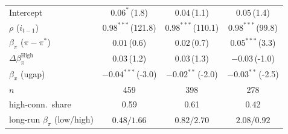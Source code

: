 \begin{tabular}{lccc}
Intercept & $0.06^{*}$\,{\scriptsize(1.8)} & $0.04$\,{\scriptsize(1.1)} & $0.05$\,{\scriptsize(1.4)} \\
$\rho$ ($i_{t-1}$) & $0.98^{***}$\,{\scriptsize(121.8)} & $0.98^{***}$\,{\scriptsize(110.1)} & $0.98^{***}$\,{\scriptsize(99.8)} \\
$\beta_\pi$ ($\pi-\pi^*$) & $0.01$\,{\scriptsize(0.6)} & $0.02$\,{\scriptsize(0.7)} & $0.05^{***}$\,{\scriptsize(3.3)} \\
$\Delta\beta_\pi^{\text{High}}$ & $0.03$\,{\scriptsize(1.2)} & $0.03$\,{\scriptsize(1.3)} & $-0.03$\,{\scriptsize(-1.0)} \\
$\beta_x$ (ugap) & $-0.04^{***}$\,{\scriptsize(-3.0)} & $-0.02^{**}$\,{\scriptsize(-2.0)} & $-0.03^{**}$\,{\scriptsize(-2.5)} \\
\addlinespace
$n$ & 459 & 398 & 278 \\
high-conn.\ share & 0.59 & 0.61 & 0.42 \\
long-run $\beta_\pi$ (low/high) & $0.48/1.66$ & $0.82/2.70$ & $2.08/0.92$ \\
\bottomrule
\end{tabular}
